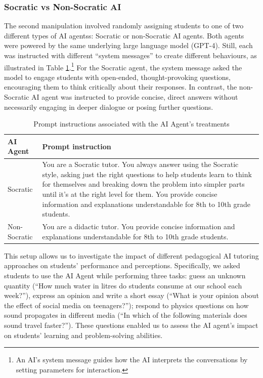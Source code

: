 \documentclass[
  11pt,
]{article}
\begin{document}
\subsubsection{Socratic vs Non-Socratic AI}\label{socratic-vs-non-socratic-ai}

The second manipulation involved randomly assigning students to one of two different types of AI agentss: Socratic or non-Socratic AI agents. Both agents were powered by the same underlying large language model (GPT-4). Still, each was instructed with different ``system messages'' to create different behaviours, as illustrated in Table \ref{tab:prompts}.\footnote{An AI's system message guides how the AI interprets the conversations by setting parameters for interaction.} For the Socratic agent, the system message asked the model to engage students with open-ended, thought-provoking questions, encouraging them to think critically about their responses. In contrast, the non-Socratic AI agent was instructed to provide concise, direct answers without necessarily engaging in deeper dialogue or posing further questions.

\begin{table}

\caption{\label{tab:prompts}Prompt instructions associated with the AI Agent's treatments}
\centering
\begin{tabular}[t]{l>{\raggedright\arraybackslash}p{4in}}
\toprule
AI Agent & Prompt instruction\\
\midrule
Socratic & You are a Socratic tutor. You always answer using the Socratic style, asking just the right questions to help students learn to think for themselves and breaking down the problem into simpler parts until it's at the right level for them. You provide concise information and explanations understandable for 8th to 10th grade students.\\
Non-Socratic & You are a didactic tutor. You provide concise information and explanations understandable for 8th to 10th grade students.\\
\bottomrule
\end{tabular}
\end{table}

This setup allows us to investigate the impact of different pedagogical AI tutoring approaches on students' performance and perceptions. Specifically, we asked students to use the AI Agent while performing three tasks: guess an unknown quantity (``How much water in litres do students consume at our school each week?''), express an opinion and write a short essay (``What is your opinion about the effect of social media on teenagers?''); respond to physics questions on how sound propagates in different media (``In which of the following materials does sound travel faster?''). These questions enabled us to assess the AI agent's impact on students' learning and problem-solving abilities.
\end{document}
